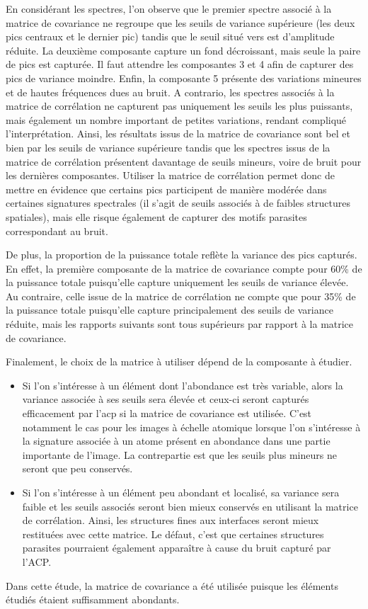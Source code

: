         En considérant les spectres, l'on observe que le premier spectre associé à la matrice de covariance ne regroupe que les seuils de variance supérieure (les deux pics centraux et le dernier pic) tandis que le seuil situé vers  est d'amplitude réduite. La deuxième composante capture un fond décroissant, mais seule la paire de pics est capturée. Il faut attendre les composantes 3 et 4 afin de capturer des pics de variance moindre. Enfin, la composante 5 présente des variations mineures et de hautes fréquences dues au bruit. A contrario, les spectres associés à la matrice de corrélation ne capturent pas uniquement les seuils les plus puissants, mais également un nombre important de petites variations, rendant compliqué l'interprétation.
        Ainsi, les résultats issus de la matrice de covariance sont bel et bien  par les seuils de variance supérieure tandis que les spectres issus de la matrice de corrélation présentent davantage de seuils mineurs, voire de bruit pour les dernières composantes. Utiliser la matrice de corrélation permet donc de mettre en évidence que certains pics participent de manière modérée dans certaines signatures spectrales (il s'agit de seuils associés à de faibles structures spatiales), mais elle risque également de capturer des motifs parasites correspondant au bruit.

        De plus, la proportion de la puissance totale reflète la variance des pics capturés. En effet, la première composante de la matrice de covariance compte pour 60\% de la puissance totale puisqu'elle capture uniquement les seuils de variance élevée. Au contraire, celle issue de la matrice de corrélation ne compte que pour 35\% de la puissance totale puisqu'elle capture principalement des seuils de variance réduite, mais les rapports suivants sont tous supérieurs par rapport à la matrice de covariance.

        Finalement, le choix de la matrice à utiliser dépend de la composante à étudier.
        \begin{itemize}
            \item Si l'on s'intéresse à un élément dont l'abondance est très variable, alors la variance associée à ses seuils sera élevée et ceux-ci seront capturés efficacement par l'\gls{acp} si la matrice de covariance est utilisée. C'est notamment le cas pour les images à échelle atomique lorsque l'on s'intéresse à la signature associée à un atome présent en abondance dans une partie importante de l'image. La contrepartie est que les seuils plus mineurs ne seront que peu conservés.
            \item Si l'on s'intéresse à un élément peu abondant et localisé, sa variance sera faible et les seuils associés seront bien mieux conservés en utilisant la matrice de corrélation. Ainsi, les structures fines aux interfaces seront mieux restituées avec cette matrice. Le défaut, c'est que certaines structures parasites pourraient également apparaître à cause du bruit capturé par l'ACP.
        \end{itemize}
        Dans cette étude, la matrice de covariance a été utilisée puisque les éléments étudiés étaient suffisamment abondants.
        
